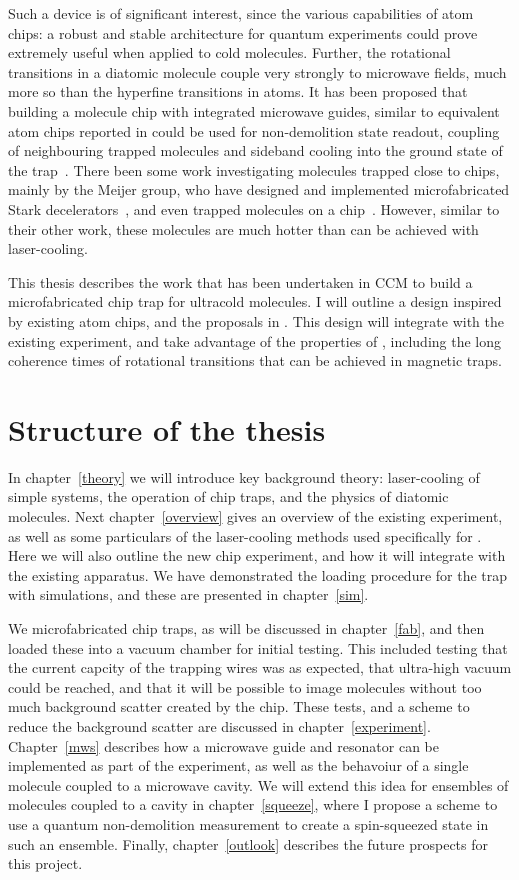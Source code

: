Such a device is of significant interest, since the various capabilities of
atom chips: a robust and stable architecture for quantum experiments could
prove extremely useful when applied to cold molecules.  Further, the rotational
transitions in a diatomic molecule couple very strongly to microwave fields,
much more so than the hyperfine transitions in atoms. It has been proposed that
building a molecule chip with integrated microwave guides, similar to
equivalent atom chips reported in  could be used
for non-demolition state readout, coupling of neighbouring trapped molecules
and sideband cooling into the ground state of the trap~\cite{Andre2006}.
%
There been some work investigating molecules trapped close to chips, mainly by
the Meijer group, who have designed and implemented microfabricated Stark
decelerators~\cite{Meek2008}, and even trapped molecules on a
chip~\cite{Meek2009}. However, similar to their other work, these molecules are
much hotter than can be achieved with laser-cooling.

This thesis describes the work that has been undertaken in CCM to build a
microfabricated chip trap for ultracold \CaF{} molecules. I will outline a
design inspired by existing atom chips, and the proposals in
. This design will integrate with the existing experiment,
and take advantage of the properties of \CaF{}, including the long coherence
times of rotational transitions that can be achieved in magnetic traps.

\section{Structure of the thesis}

In chapter~\ref{theory} we will introduce key background theory: 
laser-cooling of simple systems, the operation of chip traps, and the physics
of diatomic molecules. Next chapter~\ref{overview} gives an overview of the
existing \CaF{} experiment, as well as some particulars of the laser-cooling
methods used specifically for \CaF{}. Here we will also outline the new chip
experiment, and how it will integrate with the existing apparatus. We have
demonstrated the loading procedure for the trap with simulations, and these are
presented in chapter~\ref{sim}.

We microfabricated chip traps, as will be discussed in chapter~\ref{fab}, and
then loaded these into a vacuum chamber for initial testing. This included
testing that the current capcity of the trapping wires was as expected, that
ultra-high vacuum could be reached, and that it will be possible to image
molecules without too much background scatter created by the chip. These tests,
and a scheme to reduce the background scatter are discussed in
chapter~\ref{experiment}. Chapter~\ref{mws} describes how a microwave guide and
resonator can be implemented as part of the experiment, as well as the
behavoiur of a single molecule coupled to a microwave cavity. We will extend
this idea for ensembles of molecules coupled to a cavity in
chapter~\ref{squeeze}, where I propose a scheme to use a quantum non-demolition
measurement to create a spin-squeezed state in such an ensemble. Finally,
chapter~\ref{outlook} describes the future prospects for this project.
